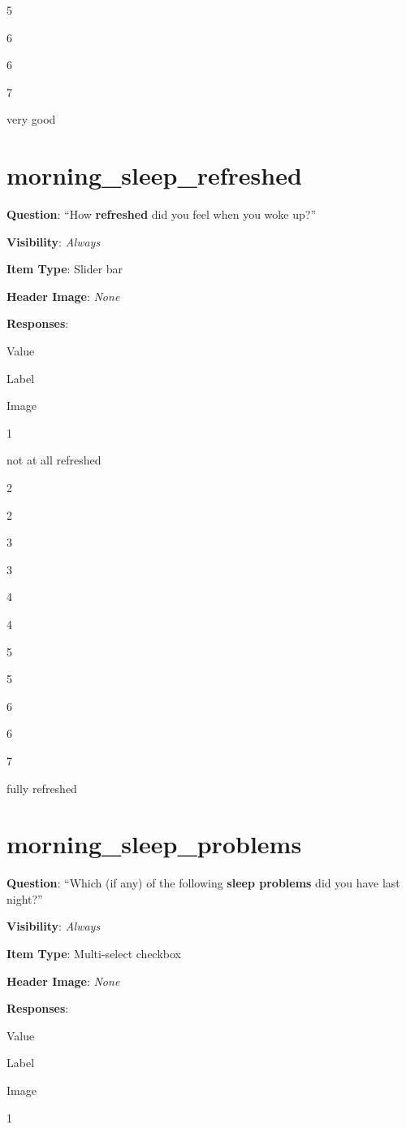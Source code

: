 \documentclass[]{book}
\begin{document}
5

6

6

7

very good

\hypertarget{morning_sleep_refreshed}{%
\section{morning\_sleep\_refreshed}\label{morning_sleep_refreshed}}

\textbf{Question}: ``How \textbf{refreshed} did you feel when you woke up?''

\textbf{Visibility}: \emph{Always}

\textbf{Item Type}: Slider bar

\textbf{Header Image}: \emph{None}

\textbf{Responses}:

Value

Label

Image

1

not at all refreshed

2

2

3

3

4

4

5

5

6

6

7

fully refreshed

\hypertarget{morning_sleep_problems}{%
\section{morning\_sleep\_problems}\label{morning_sleep_problems}}

\textbf{Question}: ``Which (if any) of the following \textbf{sleep problems} did you have last night?''

\textbf{Visibility}: \emph{Always}

\textbf{Item Type}: Multi-select checkbox

\textbf{Header Image}: \emph{None}

\textbf{Responses}:

Value

Label

Image

1
\end{document}

